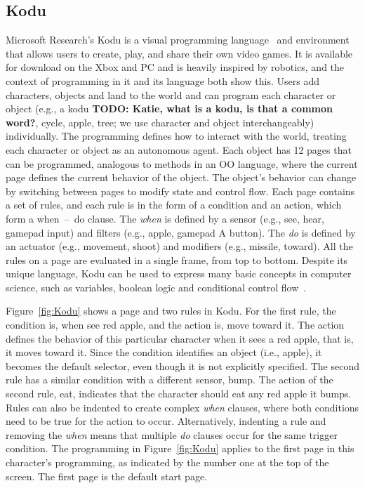 \documentclass{sig-alternate}
\newcommand{\todo}[1]{\textbf{TODO: #1}}
\begin{document}
\subsection{Kodu}
Microsoft Research's Kodu is a visual programming language~\cite{kodugrammar} and environment that allows users to create, play, and share their own video games. 
It is available for download on the Xbox and PC and is heavily inspired by robotics, and the context of programming in it and its language both show this. 
Users add characters, objects and land to the world and can program each character or object (e.g., a kodu \todo{Katie, what is a kodu, is that a common word?}, cycle, apple, tree; we use character and object interchangeably) individually. The programming defines how to interact with the world, treating each character or object as an autonomous agent. Each object has 12 pages that can be programmed, analogous to methods in an OO language, where the current page defines the current behavior of the object. 
The object's behavior can change by switching between pages to modify state and control flow. 
Each page contains a set of rules, and each rule is in the form of a condition and an action, which form a when~--~do clause. The \emph{when} is defined by a sensor (e.g., see, hear, gamepad input) and filters (e.g., apple, gamepad A button). The \emph{do} is defined by an actuator (e.g., movement, shoot) and modifiers (e.g., missile, toward). All the rules on a page are evaluated in a single frame, from top to bottom. 
Despite its unique language, Kodu  can be used to express many basic concepts in computer science, such as variables, boolean logic and conditional control flow~\cite{Stolee:2011:ECS:1953163.1953197}. 

Figure~\ref{fig:Kodu} shows a page and two rules  in Kodu. For the first rule, the condition is, when see red apple, and the action is, move toward it. The action defines the behavior of this particular character when it sees a red apple, that is, it moves toward it. Since the condition identifies an object (i.e., apple), it becomes the default selector, even though it is not explicitly specified. The second rule has a similar condition with a different sensor, bump. The action of the second rule, eat, indicates that the character should eat any red apple it bumps. 
Rules can also be indented to create complex \emph{when} clauses, where both conditions need to be true for the action to occur. Alternatively, indenting a rule and removing the \emph{when} means that multiple \emph{do} clauses occur for the same trigger condition. 
The programming in Figure~\ref{fig:Kodu} applies to the first page in this character's programming, as indicated by the number one at the top of the screen. The first page is the default start page.
\end{document}
